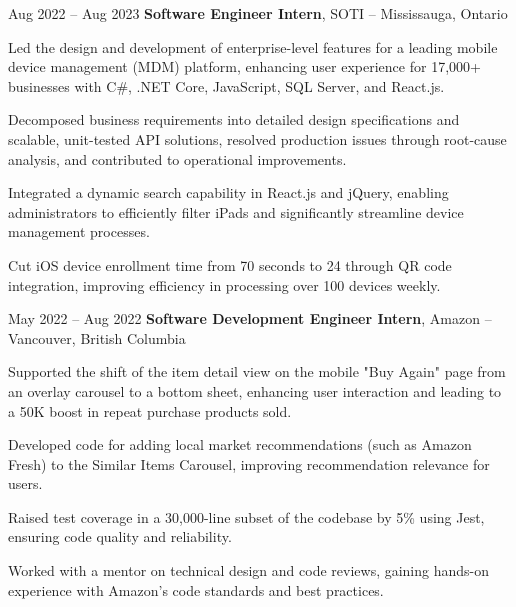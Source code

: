 \begin{twocolentry}{
    Aug 2022 – Aug 2023
}
    \textbf{Software Engineer Intern}, SOTI -- Mississauga, Ontario
\end{twocolentry}

\vspace{0.10 cm}
\begin{onecolentry}
    \begin{highlights}
        \item Led the design and development of enterprise-level features for a leading mobile device management (MDM) platform, enhancing user experience for 17,000+ businesses with C#, .NET Core, JavaScript, SQL Server, and React.js.
        \item Decomposed business requirements into detailed design specifications and scalable, unit-tested API solutions, resolved production issues through root-cause analysis, and contributed to operational improvements.
        \item Integrated a dynamic search capability in React.js and jQuery, enabling administrators to efficiently filter iPads and significantly streamline device management processes.
        \item Cut iOS device enrollment time from 70 seconds to 24 through QR code integration, improving efficiency in processing over 100 devices weekly.
    \end{highlights}
\end{onecolentry}

\vspace{0.2 cm}

\begin{twocolentry}{
    May 2022 – Aug 2022
}
    \textbf{Software Development Engineer Intern}, Amazon -- Vancouver, British Columbia
\end{twocolentry}

\vspace{0.10 cm}
\begin{onecolentry}
    \begin{highlights}
        \item Supported the shift of the item detail view on the mobile "Buy Again" page from an overlay carousel to a bottom sheet, enhancing user interaction and leading to a 50K boost in repeat purchase products sold.
        \item Developed code for adding local market recommendations (such as Amazon Fresh) to the Similar Items Carousel, improving recommendation relevance for users.
        \item Raised test coverage in a 30,000-line subset of the codebase by 5\% using Jest, ensuring code quality and reliability.
        \item Worked with a mentor on technical design and code reviews, gaining hands-on experience with Amazon’s code standards and best practices.
    \end{highlights}
\end{onecolentry}

